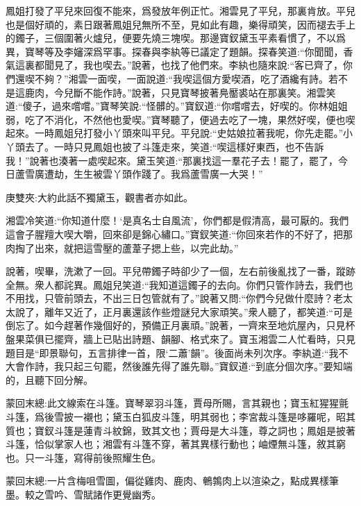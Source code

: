 \begin{parag}
    鳳姐打發了平兒來回復不能來，爲發放年例正忙。湘雲見了平兒，那裏肯放。平兒也是個好頑的，素日跟著鳳姐兒無所不至，見如此有趣，樂得頑笑，因而褪去手上的鐲子，三個圍著火爐兒，便要先燒三塊喫。那邊寶釵黛玉平素看慣了，不以爲異，寶琴等及李嬸深爲罕事。探春與李紈等已議定了題韻。探春笑道:“你聞聞，香氣這裏都聞見了，我也喫去。”說著，也找了他們來。李紈也隨來說:“客已齊了，你們還喫不夠？”湘雲一面喫，一面說道:“我喫這個方愛喫酒，吃了酒纔有詩。若不是這鹿肉，今兒斷不能作詩。”說著，只見寶琴披著鳧靨裘站在那裏笑。湘雲笑道:“傻子，過來嚐嚐。”寶琴笑說:“怪髒的。”寶釵道:“你嚐嚐去，好喫的。你林姐姐弱，吃了不消化，不然他也愛喫。”寶琴聽了，便過去吃了一塊，果然好喫，便也喫起來。一時鳳姐兒打發小丫頭來叫平兒。平兒說:“史姑娘拉著我呢，你先走罷。”小丫頭去了。一時只見鳳姐也披了斗篷走來，笑道:“喫這樣好東西，也不告訴我！”說著也湊著一處喫起來。黛玉笑道:“那裏找這一羣花子去！罷了，罷了，今日蘆雪廣遭劫，生生被雲丫頭作踐了。我爲蘆雪廣一大哭！”\begin{note}庚雙夾:大約此話不獨黛玉，觀書者亦如此。\end{note}湘雲冷笑道:“你知道什麼！‘是真名士自風流’，你們都是假清高，最可厭的。我們這會子腥羶大喫大嚼，回來卻是錦心繡口。”寶釵笑道:“你回來若作的不好了，把那肉掏了出來，就把這雪壓的蘆葦子揌上些，以完此劫。”
\end{parag}


\begin{parag}
    說著，喫畢，洗漱了一回。平兒帶鐲子時卻少了一個，左右前後亂找了一番，蹤跡全無。衆人都詫異。鳳姐兒笑道:“我知道這鐲子的去向。你們只管作詩去，我們也不用找，只管前頭去，不出三日包管就有了。”說著又問:“你們今兒做什麼詩？老太太說了，離年又近了，正月裏還該作些燈謎兒大家頑笑。”衆人聽了，都笑道:“可是倒忘了。如今趕著作幾個好的，預備正月裏頑。”說著，一齊來至地炕屋內，只見杯盤果菜俱已擺齊，牆上已貼出詩題、韻腳、格式來了。寶玉湘雲二人忙看時，只見題目是“即景聯句，五言排律一首，限‘二蕭’韻”。後面尚未列次序。李紈道:“我不大會作詩，我只起三句罷，然後誰先得了誰先聯。”寶釵道:“到底分個次序。”要知端的，且聽下回分解。
\end{parag}


\begin{parag}
    \begin{note}蒙回末總:此文線索在斗篷。寶琴翠羽斗篷，賈母所賜，言其親也；寶玉紅猩猩氈斗篷，爲後雪披一襯也；黛玉白狐皮斗篷，明其弱也；李宮裁斗篷是哆羅呢，昭其質也；寶釵斗篷是蓮青斗紋錦，致其文也；賈母是大斗篷，尊之詞也；鳳姐是披著斗篷，恰似掌家人也；湘雲有斗篷不穿，著其異樣行動也；岫煙無斗篷，敘其窮也。只一斗篷，寫得前後照耀生色。\end{note}
\end{parag}


\begin{parag}
    \begin{note}蒙回末總:一片含梅咀雪圖，偏從雞肉、鹿肉、鵪鶉肉上以渲染之，點成異樣筆墨。較之雪吟、雪賦諸作更覺幽秀。\end{note}
\end{parag}

